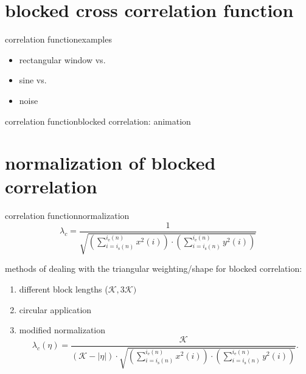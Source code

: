     \section[blocked correlation]{blocked cross correlation function}
        \begin{frame}{correlation function}{examples}
			\begin{itemize}
				\item	rectangular window vs.
				\item	sine vs.
				\item	noise
			\end{itemize}
            \vspace{-5mm}
        \end{frame}	

        \begin{frame}{correlation function}{blocked correlation: animation}
            \begin{center}
            \end{center}
        \end{frame}	 

    \section[normalization]{normalization of blocked correlation}
        \begin{frame}{correlation function}{normalization}
        \vspace{-3mm}
            \begin{equation*}\label{eq:corrnorm}
                \lambda_c = \frac{1}{\sqrt{\left(\sum\limits_{i=i_{\mathrm{s}}(n)}^{i_{\mathrm{e}}(n)}{x^2(i)}\right)\cdot \left(\sum\limits_{i=i_{\mathrm{s}}(n)}^{i_{\mathrm{e}}(n)}{y^2(i)}\right)}} 
            \end{equation*}
            
            \bigskip
            methods of dealing with the triangular weighting/shape for blocked correlation:
            \begin{enumerate}
                \item<2->	different block lengths ($\mathcal{K},3\mathcal{K})$
                \item<2->	circular application
                \item<2->	modified normalization
                    \begin{equation*}
                        \lambda_c(\eta) = \frac{\mathcal{K}}{(\mathcal{K}-|\eta|)\cdot\sqrt{\left(\sum\limits_{i=i_{\mathrm{s}}(n)}^{i_{\mathrm{e}}(n)}{x^2(i)}\right)\cdot \left(\sum\limits_{i=i_{\mathrm{s}}(n)}^{i_{\mathrm{e}}(n)}{y^2(i)}\right)}} .
                    \end{equation*}
            \end{enumerate}
        \end{frame}	

